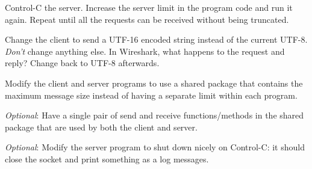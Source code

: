 \STEP Control-C the server. Increase the server limit in the program code and run it
again. Repeat until all the requests can be received without being truncated.



Change the client  to send a UTF-16 encoded string instead of the
current UTF-8. \emph{Don't} change anything else. In Wireshark, what happens to the
request and reply? Change back to UTF-8 afterwards.

Modify the client and server programs to use a shared package that contains the
maximum message size instead of having a separate limit within each program.

\emph{Optional}: Have a single pair of send and receive functions/methods
in the shared package that are used by both the client and server.

\emph{Optional}: Modify the server program to shut down nicely on Control-C:
it should close the socket and print something as a log messages.


\COPYRIGHT


